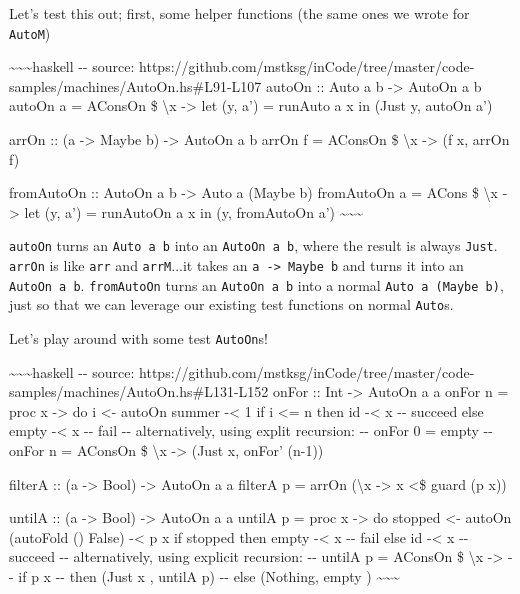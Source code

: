 \documentclass[]{article}
\begin{document}
Let's test this out; first, some helper functions (the same ones we wrote for
\texttt{AutoM})

\textasciitilde{}\textasciitilde{}\textasciitilde{}haskell -\/- source:
https://github.com/mstksg/inCode/tree/master/code-samples/machines/AutoOn.hs\#L91-L107
autoOn :: Auto a b -\textgreater{} AutoOn a b autoOn a = AConsOn \$
\textbackslash{}x -\textgreater{} let (y, a') = runAuto a x in (Just y, autoOn
a')

arrOn :: (a -\textgreater{} Maybe b) -\textgreater{} AutoOn a b arrOn f =
AConsOn \$ \textbackslash{}x -\textgreater{} (f x, arrOn f)

fromAutoOn :: AutoOn a b -\textgreater{} Auto a (Maybe b) fromAutoOn a = ACons
\$ \textbackslash{}x -\textgreater{} let (y, a') = runAutoOn a x in (y,
fromAutoOn a') \textasciitilde{}\textasciitilde{}\textasciitilde{}

\texttt{autoOn} turns an \texttt{Auto\ a\ b} into an \texttt{AutoOn\ a\ b},
where the result is always \texttt{Just}. \texttt{arrOn} is like \texttt{arr}
and \texttt{arrM}...it takes an \texttt{a\ -\textgreater{}\ Maybe\ b} and turns
it into an \texttt{AutoOn\ a\ b}. \texttt{fromAutoOn} turns an
\texttt{AutoOn\ a\ b} into a normal \texttt{Auto\ a\ (Maybe\ b)}, just so that
we can leverage our existing test functions on normal \texttt{Auto}s.

Let's play around with some test \texttt{AutoOn}s!

\textasciitilde{}\textasciitilde{}\textasciitilde{}haskell -\/- source:
https://github.com/mstksg/inCode/tree/master/code-samples/machines/AutoOn.hs\#L131-L152
onFor :: Int -\textgreater{} AutoOn a a onFor n = proc x -\textgreater{} do i
\textless{}- autoOn summer -\textless{} 1 if i \textless{}= n then id
-\textless{} x -\/- succeed else empty -\textless{} x -\/- fail -\/-
alternatively, using explit recursion: -\/- onFor 0 = empty -\/- onFor n =
AConsOn \$ \textbackslash{}x -\textgreater{} (Just x, onFor' (n-1))

filterA :: (a -\textgreater{} Bool) -\textgreater{} AutoOn a a filterA p = arrOn
(\textbackslash{}x -\textgreater{} x \textless{}\$ guard (p x))

untilA :: (a -\textgreater{} Bool) -\textgreater{} AutoOn a a untilA p = proc x
-\textgreater{} do stopped \textless{}- autoOn (autoFold (\textbar{}\textbar{})
False) -\textless{} p x if stopped then empty -\textless{} x -\/- fail else id
-\textless{} x -\/- succeed -\/- alternatively, using explicit recursion: -\/-
untilA p = AConsOn \$ \textbackslash{}x -\textgreater{} -\/- if p x -\/- then
(Just x , untilA p) -\/- else (Nothing, empty )
\textasciitilde{}\textasciitilde{}\textasciitilde{}
\end{document}

